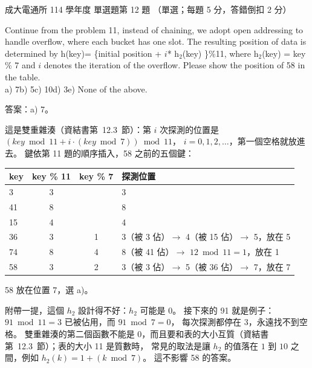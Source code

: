 \begin{pastexam}[label={px:ncku-114-cce-ds-12}]{成大電通所 114 學年度 單選題第 12 題}
（單選；每題 5 分，答錯倒扣 2 分）

Continue from the problem 11, instead of chaining, we adopt open addressing to handle overflow, where each bucket
has one slot. The resulting position of data is determined by h(key)= \{initial position + $i$* h$_2$(key) \}\%11,
where h$_2$(key) = key \% 7 and $i$ denotes the iteration of the overflow. Please show the position of 58 in the
table.\\
a) 7\quad b) 5\quad c) 10\quad d) 3\quad e) None of the above.
\end{pastexam}

\begin{pastsoln}
答案：a) 7。

這是雙重雜湊（資結書第~12.3~節）：第 $i$ 次探測的位置是 $(\mathit{key} \bmod 11 + i \cdot (\mathit{key} \bmod 7)) \bmod 11$，
$i = 0, 1, 2, \ldots$，第一個空格就放進去。 鍵依第 11 題的順序插入，58 之前的五個鍵：
\begin{center}
\begin{tabular}{lccl}
\toprule
key & key \% 11 & key \% 7 & 探測位置 \\
\midrule
3 & 3 & & 3 \\
41 & 8 & & 8 \\
15 & 4 & & 4 \\
36 & 3 & 1 & 3（被 3 佔）$\to$ 4（被 15 佔）$\to$ 5，放在 5 \\
74 & 8 & 4 & 8（被 41 佔）$\to$ $12 \bmod 11 = 1$，放在 1 \\
58 & 3 & 2 & 3（被 3 佔）$\to$ 5（被 36 佔）$\to$ 7，放在 7 \\
\bottomrule
\end{tabular}
\end{center}
58 放在位置 7，選 a)。

附帶一提，這個 $h_2$ 設計得不好：$h_2$ 可能是 0。 接下來的 91 就是例子：$91 \bmod 11 = 3$ 已被佔用，而 $91 \bmod 7 = 0$，
每次探測都停在 3，永遠找不到空格。 雙重雜湊的第二個函數不能是 0，而且要和表的大小互質（資結書第~12.3~節）；表的大小 11 是質數時，
常見的取法是讓 $h_2$ 的值落在 $1$ 到 $10$ 之間，例如 $h_2(k) = 1 + (k \bmod 7)$。 這不影響 58 的答案。
\end{pastsoln}
